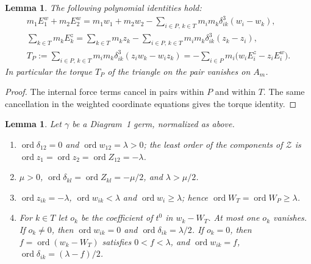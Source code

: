 \documentclass[Threeside,11pt]{article}
\newtheorem{lemma}[theorem]{Lemma}
\theoremstyle{definition}
\theoremstyle{remark}
\numberwithin{equation}{section}
\theoremstyle{remark}
\newcommand{\ord}{\operatorname{ord}}
\newenvironment{romanlist}{\begin{enumerate}\renewcommand{\labelenumi}{(\roman{enumi})}%
  \renewcommand{\theenumi}{\roman{enumi}}}{\end{enumerate}}
\begin{document}
\begin{lemma}\label{lem:d1-syzygies}
{The following polynomial identities hold:}
\begin{gather*}
  m_1E^w_1+m_2E^w_2=m_1w_1+m_2w_2-\sum_{i\in P,\,k\in T}m_im_k\delta_{ik}^3(w_i-w_k),\\
  \sum_{k\in T}m_kE^z_k=\sum_{k\in T}m_kz_k-\sum_{i\in P,\,k\in T}m_im_k\delta_{ik}^3(z_k-z_i),\\
  T_P:=\sum_{i\in P,\,k\in T}m_im_k\delta_{ik}^3(z_iw_k-w_iz_k)
  =-\sum_{i\in P}m_i\big(w_iE^z_i-z_iE^w_i\big).
\end{gather*}
In particular the torque $T_P$ of the triangle on the pair vanishes on $A_m$.
\end{lemma}

\begin{proof}
{The internal force terms cancel in pairs within $P$ and within $T$.
The same cancellation in the weighted coordinate equations gives the torque identity.}
\end{proof}

\begin{lemma}\label{lem:d1-orders}
Let $\gamma$ be a Diagram~1 germ, normalized as above.
\begin{romanlist}
  \item $\ord\delta_{12}=0$ and $\ord w_{12}=\lambda>0$; the least order of the components of
  $\mathcal Z$ is $\ord z_1=\ord z_2=\ord Z_{12}=-\lambda$.
  \item $\mu>0$, $\ord\delta_{kl}=\ord Z_{kl}=-\mu/2$, and $\lambda>\mu/2$.
  \item $\ord z_{ik}=-\lambda$, $\ord w_{ik}<\lambda$ and $\ord w_i\ge\lambda$; hence
  $\ord W_T=\ord W_P\ge\lambda$.
  \item For $k\in T$ let $o_k$ be the coefficient of $t^0$ in $w_k-W_T$.  At most one $o_k$
  vanishes.  If $o_k\ne0$, then $\ord w_{ik}=0$ and $\ord\delta_{ik}=\lambda/2$.  If $o_k=0$, then
  $f=\ord(w_k-W_T)$ satisfies $0<f<\lambda$, and $\ord w_{ik}=f$, $\ord\delta_{ik}=(\lambda-f)/2$.
\end{romanlist}
\end{lemma}
\end{document}

